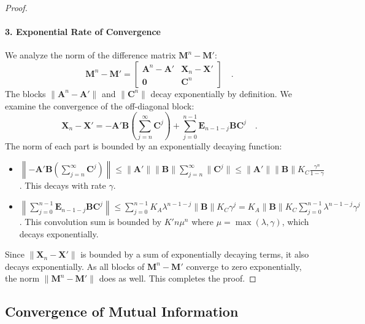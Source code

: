 \documentclass[../../main.tex]{subfiles}
\begin{document}
\begin{proof}
\paragraph{3. Exponential Rate of Convergence}
We analyze the norm of the difference matrix $\bm{M}^n - \bm{M}'$:
\[
    \bm{M}^n - \bm{M}' = 
    \begin{bmatrix}
        \bm{A}^n - \bm{A}' & \bm{X}_n - \bm{X}' \\
        \bm{0} & \bm{C}^n
    \end{bmatrix}
    \quad .
\]
The blocks $\|\bm{A}^n - \bm{A}'\|$ and $\|\bm{C}^n\|$ decay exponentially by definition. We examine the convergence of the off-diagonal block:
\[
    \bm{X}_n - \bm{X}' = -\bm{A}'\bm{B}\left(\sum_{j=n}^{\infty}\bm{C}^j\right) + \sum_{j=0}^{n-1}\bm{E}_{n-1-j}\bm{B}\bm{C}^j \quad .
\]
The norm of each part is bounded by an exponentially decaying function:
\begin{itemize}
    \item $\left\|-\bm{A}'\bm{B}\left(\sum_{j=n}^{\infty}\bm{C}^j\right)\right\| \le \|\bm{A}'\|\|\bm{B}\| \sum_{j=n}^{\infty}\|\bm{C}^j\| \le \|\bm{A}'\|\|\bm{B}\| K_C \frac{\gamma^n}{1-\gamma}$. This decays with rate $\gamma$.
    \item $\left\|\sum_{j=0}^{n-1}\bm{E}_{n-1-j}\bm{B}\bm{C}^j\right\| \le \sum_{j=0}^{n-1} K_A\lambda^{n-1-j} \|\bm{B}\| K_C\gamma^j = K_A \|\bm{B}\| K_C \sum_{j=0}^{n-1} \lambda^{n-1-j} \gamma^j$. This convolution sum is bounded by $K'n\mu^n$ where $\mu = \max(\lambda, \gamma)$, which decays exponentially.
\end{itemize}
Since $\|\bm{X}_n - \bm{X}'\|$ is bounded by a sum of exponentially decaying terms, it also decays exponentially. As all blocks of $\bm{M}^n - \bm{M}'$ converge to zero exponentially, the norm $\|\bm{M}^n - \bm{M}'\|$ does as well. This completes the proof.
\end{proof}

\clearpage
\subsection{Convergence of Mutual Information}
\end{document}
